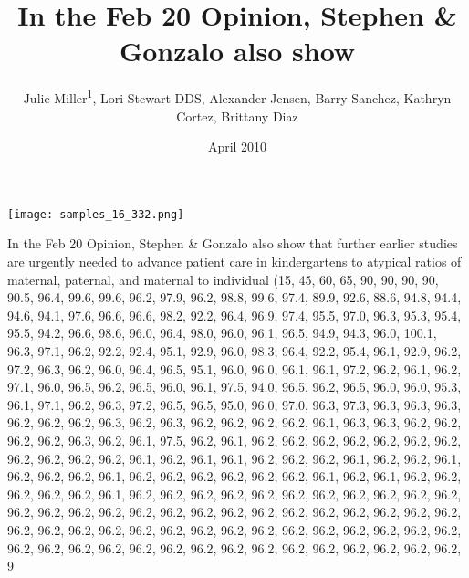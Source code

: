 \documentclass{article}
\title{In the Feb 20 Opinion, Stephen & Gonzalo also show}
\author{Julie Miller\textsuperscript{1},  Lori Stewart DDS,  Alexander Jensen,  Barry Sanchez,  Kathryn Cortez,  Brittany Diaz}
\affil{\textsuperscript{1}The Chinese University of Hong Kong (Shenzhen)}
\date{April 2010}
\begin{document}
\maketitle

\begin{center}
\begin{minipage}{0.75\linewidth}
\texttt{[image: samples\_16\_332.png]}
\end{minipage}
\end{center}

In the Feb 20 Opinion, Stephen \& Gonzalo also show that further earlier studies are urgently needed to advance patient care in kindergartens to atypical ratios of maternal, paternal, and maternal to individual (15, 45, 60, 65, 90, 90, 90, 90, 90.5, 96.4, 99.6, 99.6, 96.2, 97.9, 96.2, 98.8, 99.6, 97.4, 89.9, 92.6, 88.6, 94.8, 94.4, 94.6, 94.1, 97.6, 96.6, 96.6, 98.2, 92.2, 96.4, 96.9, 97.4, 95.5, 97.0, 96.3, 95.3, 95.4, 95.5, 94.2, 96.6, 98.6, 96.0, 96.4, 98.0, 96.0, 96.1, 96.5, 94.9, 94.3, 96.0, 100.1, 96.3, 97.1, 96.2, 92.2, 92.4, 95.1, 92.9, 96.0, 98.3, 96.4, 92.2, 95.4, 96.1, 92.9, 96.2, 97.2, 96.3, 96.2, 96.0, 96.4, 96.5, 95.1, 96.0, 96.0, 96.1, 96.1, 97.2, 96.2, 96.1, 96.2, 97.1, 96.0, 96.5, 96.2, 96.5, 96.0, 96.1, 97.5, 94.0, 96.5, 96.2, 96.5, 96.0, 96.0, 95.3, 96.1, 97.1, 96.2, 96.3, 97.2, 96.5, 96.5, 95.0, 96.0, 97.0, 96.3, 97.3, 96.3, 96.3, 96.3, 96.2, 96.2, 96.2, 96.3, 96.2, 96.3, 96.2, 96.2, 96.2, 96.2, 96.1, 96.3, 96.3, 96.2, 96.2, 96.2, 96.2, 96.3, 96.2, 96.1, 97.5, 96.2, 96.1, 96.2, 96.2, 96.2, 96.2, 96.2, 96.2, 96.2, 96.2, 96.2, 96.2, 96.2, 96.1, 96.2, 96.1, 96.1, 96.2, 96.2, 96.2, 96.1, 96.2, 96.2, 96.1, 96.2, 96.2, 96.2, 96.1, 96.2, 96.2, 96.2, 96.2, 96.2, 96.2, 96.1, 96.2, 96.1, 96.2, 96.2, 96.2, 96.2, 96.2, 96.1, 96.2, 96.2, 96.2, 96.2, 96.2, 96.2, 96.2, 96.2, 96.2, 96.2, 96.2, 96.2, 96.2, 96.2, 96.2, 96.2, 96.2, 96.2, 96.2, 96.2, 96.2, 96.2, 96.2, 96.2, 96.2, 96.2, 96.2, 96.2, 96.2, 96.2, 96.2, 96.2, 96.2, 96.2, 96.2, 96.2, 96.2, 96.2, 96.2, 96.2, 96.2, 96.2, 96.2, 96.2, 96.2, 96.2, 96.2, 96.2, 96.2, 96.2, 96.2, 96.2, 96.2, 96.2, 96.2, 96.2, 9
\end{document}
